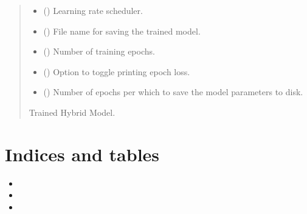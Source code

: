 \documentclass[letterpaper,10pt,english]{sphinxmanual}
\begin{document}
\begin{fulllineitems}
\begin{quote}
\begin{description}
\begin{itemize}
\item {} 
\sphinxAtStartPar
{} () \textendash{} Learning rate scheduler.

\item {} 
\sphinxAtStartPar
{} () \textendash{} File name for saving the trained model.

\item {} 
\sphinxAtStartPar
{} () \textendash{} Number of training epochs.

\item {} 
\sphinxAtStartPar
{} () \textendash{} Option to toggle printing epoch loss.

\item {} 
\sphinxAtStartPar
{} () \textendash{} Number of epochs per which to save the model parameters to disk.

\end{itemize}

\sphinxAtStartPar
Trained Hybrid Model.

\end{description}\end{quote}

\end{fulllineitems}



\chapter{Indices and tables}
\label{\detokenize{index:indices-and-tables}}\begin{itemize}
\item {} 
\sphinxAtStartPar
{}

\item {} 
\sphinxAtStartPar
{}

\item {} 
\sphinxAtStartPar
{}

\end{itemize}
\end{document}
